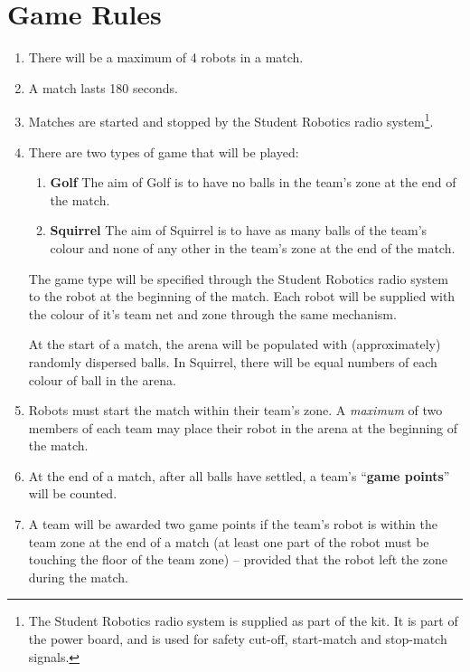 \section {Game Rules}
\label{game-rules}

\begin{enumerate}
\item There will be a maximum of 4 robots in a match.
\item A match lasts 180 seconds.
\item Matches are started and stopped by the Student Robotics radio system\footnote{The Student Robotics radio system is supplied as part of the kit.  It is part of the power board, and is used for safety cut-off, start-match and stop-match signals.}.
\item There are two types of game that will be played:
  \renewcommand{\labelenumii}{\arabic{enumii}.}
  \begin{enumerate}
  \item \textbf{Golf} The aim of Golf is to have no balls in the team's zone at the end of the match.
  \item \textbf{Squirrel} The aim of Squirrel is to have as many balls of the team's colour and none of any other in the team's zone at the end of the match.
  \end{enumerate}

The game type will be specified through the Student Robotics radio system to the robot at the beginning of the match.  Each robot will be supplied with the colour of it's team net and zone through the same mechanism.

At the start of a match, the arena will be populated with (approximately) randomly dispersed balls.  In Squirrel, there will be equal numbers of each colour of ball in the arena.

\item Robots must start the match within their team's zone.  A \emph{maximum} of two members of each team may place their robot in the arena at the beginning of the match.

\item At the end of a match, after all balls have settled, a team's ``\textbf{game points}'' will be counted.

\item A team will be awarded two game points if the team's robot is within the team zone at the end of a match (at least one part of the robot must be touching the floor of the team zone) -- provided that the robot left the zone during the match.


\end{enumerate}
